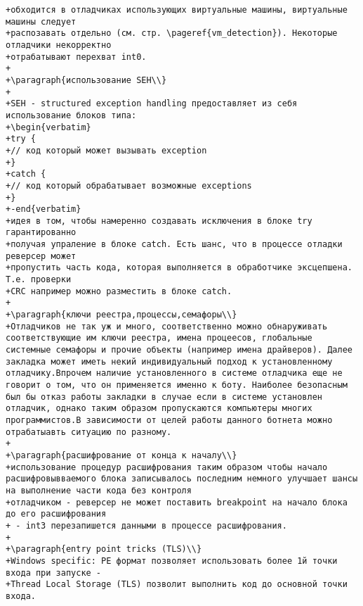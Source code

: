 \begin{verbatim}
+обходится в отладчиках использующих виртуальные машины, виртуальные машины следует
+распозавать отдельно (см. стр. \pageref{vm_detection}). Некоторые отладчики некорректно
+отрабатывают перехват int0.
+
+\paragraph{использование SEH\\}
+
+SEH - structured exception handling предоставляет из себя использование блоков типа:
+\begin{verbatim}
+try {
+// код который может вызывать exception
+}
+catch {
+// код который обрабатывает возможные exceptions
+}
+-end{verbatim}
+идея в том, чтобы намеренно создавать исключения в блоке try гарантированно
+получая упраление в блоке catch. Есть шанс, что в процессе отладки реверсер может
+пропустить часть кода, которая выполняется в обработчике эксцепшена. Т.е. проверки
+CRC например можно разместить в блоке catch.
+
+\paragraph{ключи реестра,процессы,семафоры\\}
+Отладчиков не так уж и много, соответственно можно обнаруживать соответствующие им ключи реестра, имена процеесов, глобальные системные семафоры и прочие объекты (например имена драйверов). Далее закладка может иметь некий индивидуальный подход к установленному отладчику.Впрочем наличие установленного в системе отладчика еще не говорит о том, что он применяется именно к боту. Наиболее безопасным был бы отказ работы закладки в случае если в системе установлен отладчик, однако таким образом пропускаются компьютеры многих программистов.В зависимости от целей работы данного ботнета можно отрабатыавть ситуацию по разному.
+
+\paragraph{расшифрование от конца к началу\\}
+использование процедур расшифрования таким образом чтобы начало расшифровывваемого блока записывалось последним немного улучшает шансы на выполнение части кода без контроля
+отладчиком - реверсер не может поставить breakpoint на начало блока до его расшифрования
+ - int3 перезапишется данными в процессе расшифрования.
+
+\paragraph{entry point tricks (TLS)\\}
+Windows specific: PE формат позволяет использовать более 1й точки входа при запуске -
+Thread Local Storage (TLS) позволит выполнить код до основной точки входа.


\end{verbatim}

